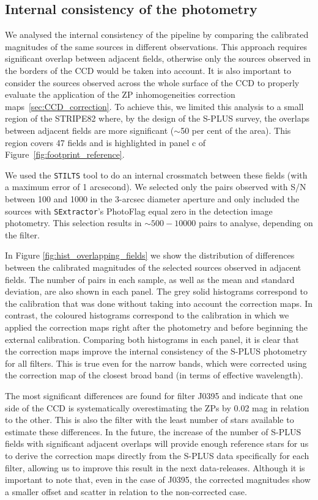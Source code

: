 \documentclass[fleqn,usenatbib]{mnras}
\begin{document}
\subsection{Internal consistency of the photometry}
\label{sec:internal_crossmatch}

We analysed the internal consistency of the pipeline by comparing the calibrated magnitudes of the same sources in different observations. This approach requires significant overlap between adjacent fields, otherwise only the sources observed in the borders of the CCD would be taken into account. It is also important to consider the sources observed across the whole surface of the CCD to properly evaluate the application of the ZP inhomogeneities correction maps~\ref{sec:CCD_correction}. To achieve this, we limited this analysis to a small region of the STRIPE82 where, by the design of the S-PLUS survey, the overlaps between adjacent fields are more significant ($\sim$50 per cent of the area). This region covers 47 fields and is highlighted in panel c of Figure~\ref{fig:footprint_reference}.

We used the \texttt{STILTS} \citep{Taylor2006} tool to do an internal crossmatch between these fields (with a maximum error of 1 arcsecond). We selected only the pairs observed with S/N between 100 and 1000 in the 3-arcsec diameter aperture and only included the sources with \texttt{SExtractor}'s PhotoFlag equal zero in the detection image photometry. This selection results in $\sim500-10000$ pairs to analyse, depending on the filter. 

In Figure \ref{fig:hist_overlapping_fields} we show the distribution of differences between the calibrated magnitudes of the selected sources observed in adjacent fields. The number of pairs in each sample, as well as the mean and standard deviation, are also shown in each panel. The grey solid histograms correspond to the calibration that was done without taking into account the correction maps. In contrast, the coloured histograms correspond to the calibration in which we applied the correction maps right after the photometry and before beginning the external calibration. Comparing both histograms in each panel, it is clear that the correction maps improve the internal consistency of the S-PLUS photometry for all filters. This is true even for the narrow bands, which were corrected using the correction map of the closest broad band (in terms of effective wavelength). 

The most significant differences are found for filter J0395 and indicate that one side of the CCD is systematically overestimating the ZPs by 0.02 mag in relation to the other. This is also the filter with the least number of stars available to estimate these differences. In the future, the increase of the number of S-PLUS fields with significant adjacent overlaps will provide enough reference stars for us to derive the correction maps directly from the S-PLUS data specifically for each filter, allowing us to improve this result in the next data-releases. Although it is important to note that, even in the case of J0395, the corrected magnitudes show a smaller offset and scatter in relation to the non-corrected case.
\end{document}
